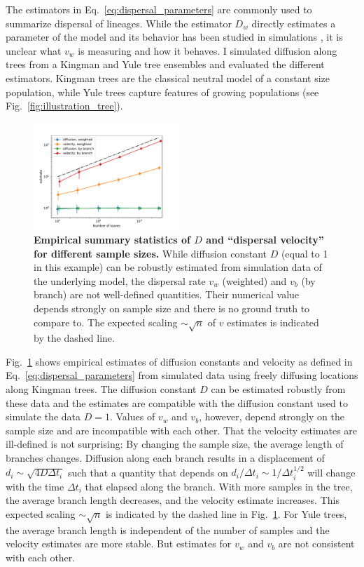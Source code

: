 \documentclass[aps,rmp, twocolumn]{revtex4}
\begin{document}
The estimators in Eq.~\ref{eq:dispersal_parameters} are commonly used to summarize dispersal of lineages.
While the estimator $D_w$ directly estimates a parameter of the model and its behavior has been studied in simulations \citep{pybus_unifying_2012}, it is unclear what $v_w$ is measuring and how it behaves.
I simulated diffusion along trees from a Kingman \citep{kingman_coalescent_1982} and Yule \citep{yule_iimathematical_1997} tree ensembles and evaluated the different estimators.
Kingman trees are the classical neutral model of a constant size population, while Yule trees capture features of growing populations (see Fig.~\ref{fig:illustration_tree}).

\begin{figure}[tb]
    \includegraphics*[width=0.48\textwidth]{figures/kingman_dispersal.pdf}
    \caption{\label{fig:D_and_v}{\bf Empirical summary statistics of $D$ and ``dispersal velocity'' for different sample sizes.}
    While diffusion constant $D$ (equal to 1 in this example) can be robustly estimated from simulation data of the underlying model, the dispersal rate $v_w$ (weighted) and $v_b$ (by branch) are not well-defined quantities. Their numerical value depends strongly on sample size and there is no ground truth to compare to. The expected scaling $\sim \sqrt{n}$ of $v$ estimates is indicated by the dashed line.}
\end{figure}


Fig.~\ref{fig:D_and_v} shows empirical estimates of diffusion constants and velocity as defined in Eq.~\ref{eq:dispersal_parameters} from simulated data using freely diffusing locations along Kingman trees.
The diffusion constant $D$ can be estimated robustly from these data and the estimates are compatible with the diffusion constant used to simulate the data $D=1$.
Values of $v_w$ and $v_b$, however, depend strongly on the sample size and are incompatible with each other.
That the velocity estimates are ill-defined is not surprising: By changing the sample size, the average length of branches changes. Diffusion along each branch results in a displacement of $d_i \sim \sqrt{4D\Delta t_i}$ such that a quantity that depends on $d_i / \Delta t_i \sim 1/\Delta t_i^{1/2}$ will change with the time $\Delta t_i$ that elapsed along the branch.
With more samples in the tree, the average branch length decreases, and the velocity estimate increases.
This expected scaling $\sim \sqrt{n}$ is indicated by the dashed line in Fig.~\ref{fig:D_and_v}.
For Yule trees, the average branch length is independent of the number of samples and the velocity estimates are more stable.
But estimates for $v_w$ and $v_b$ are not consistent with each other.
\end{document}
